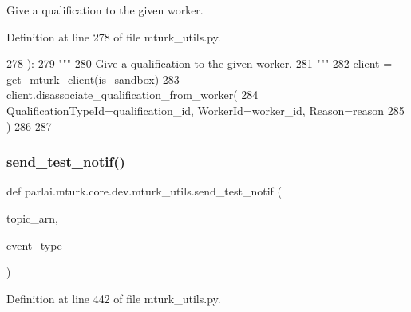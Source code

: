 \begin{DoxyVerb}Give a qualification to the given worker.
\end{DoxyVerb}
 

Definition at line 278 of file mturk\+\_\+utils.\+py.


\begin{DoxyCode}
278 ):
279     \textcolor{stringliteral}{"""}
280 \textcolor{stringliteral}{    Give a qualification to the given worker.}
281 \textcolor{stringliteral}{    """}
282     client = \hyperlink{namespaceparlai_1_1mturk_1_1core_1_1mturk__utils_a577e2527c04682284394b0951a090695}{get\_mturk\_client}(is\_sandbox)
283     client.disassociate\_qualification\_from\_worker(
284         QualificationTypeId=qualification\_id, WorkerId=worker\_id, Reason=reason
285     )
286 
287 
\end{DoxyCode}
\mbox{\label{namespaceparlai_1_1mturk_1_1core_1_1dev_1_1mturk__utils_abfc17443a7c8018fc56dcc058e7b86f1}} 
\subsubsection{\texorpdfstring{send\+\_\+test\+\_\+notif()}{send\_test\_notif()}}
{\footnotesize\ttfamily def parlai.\+mturk.\+core.\+dev.\+mturk\+\_\+utils.\+send\+\_\+test\+\_\+notif (\begin{DoxyParamCaption}\item[{}]{topic\+\_\+arn,  }\item[{}]{event\+\_\+type }\end{DoxyParamCaption})}



Definition at line 442 of file mturk\+\_\+utils.\+py.


